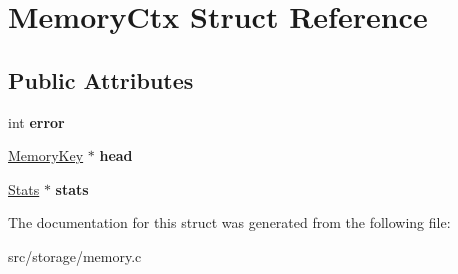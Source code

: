 \hypertarget{struct_memory_ctx}{}\section{Memory\+Ctx Struct Reference}
\label{struct_memory_ctx}
\subsection*{Public Attributes}
\begin{DoxyCompactItemize}
\item 
\hypertarget{struct_memory_ctx_aa114d6b1cd22e5dac493c10fac97844a}{}int {\bfseries error}\label{struct_memory_ctx_aa114d6b1cd22e5dac493c10fac97844a}

\item 
\hypertarget{struct_memory_ctx_a3919435ed5d1230330b2e4d085510fd7}{}\hyperlink{struct_memory_key}{Memory\+Key} $\ast$ {\bfseries head}\label{struct_memory_ctx_a3919435ed5d1230330b2e4d085510fd7}

\item 
\hypertarget{struct_memory_ctx_a168100afeb2b0d3e83600c79262df4ae}{}\hyperlink{struct_stats}{Stats} $\ast$ {\bfseries stats}\label{struct_memory_ctx_a168100afeb2b0d3e83600c79262df4ae}

\end{DoxyCompactItemize}


The documentation for this struct was generated from the following file\+:\begin{DoxyCompactItemize}
\item 
src/storage/memory.\+c\end{DoxyCompactItemize}
